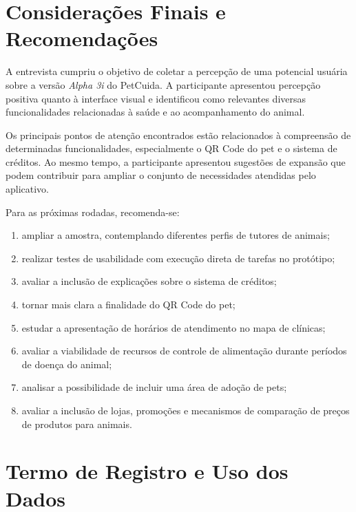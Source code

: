 \documentclass[12pt,a4paper]{article}
\begin{document}
\section{Considerações Finais e Recomendações}

A entrevista cumpriu o objetivo de coletar a percepção de uma potencial usuária sobre a
versão \textit{Alpha 3i} do PetCuida. A participante apresentou percepção positiva quanto
à interface visual e identificou como relevantes diversas funcionalidades relacionadas
à saúde e ao acompanhamento do animal.

Os principais pontos de atenção encontrados estão relacionados à compreensão de determinadas
funcionalidades, especialmente o QR Code do pet e o sistema de créditos. Ao mesmo tempo,
a participante apresentou sugestões de expansão que podem contribuir para ampliar o
conjunto de necessidades atendidas pelo aplicativo.

Para as próximas rodadas, recomenda-se:

\begin{enumerate}[label=\textbf{R\arabic*.},leftmargin=1.6cm]
  \item ampliar a amostra, contemplando diferentes perfis de tutores de animais;
  \item realizar testes de usabilidade com execução direta de tarefas no protótipo;
  \item avaliar a inclusão de explicações sobre o sistema de créditos;
  \item tornar mais clara a finalidade do QR Code do pet;
  \item estudar a apresentação de horários de atendimento no mapa de clínicas;
  \item avaliar a viabilidade de recursos de controle de alimentação durante períodos
        de doença do animal;
  \item analisar a possibilidade de incluir uma área de adoção de pets;
  \item avaliar a inclusão de lojas, promoções e mecanismos de comparação de preços de
        produtos para animais.
\end{enumerate}

\appendix

\section{Termo de Registro e Uso dos Dados}
\end{document}
